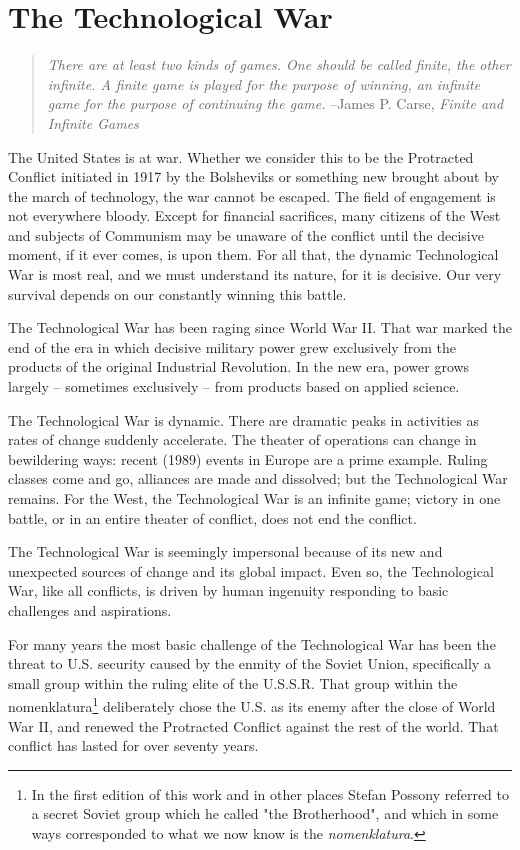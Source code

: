 \chapter{The Technological War}

\begin{quotation}
\textit{There are at least two kinds of games. One should be called finite, the other infinite. A finite game is played for the purpose of winning, an infinite game for the purpose of continuing the game.}
\newline
--James P. Carse, \textit{Finite and Infinite Games}
\end{quotation}

The United States is at war. Whether we consider this to be the Protracted Conflict initiated in 1917 by the Bolsheviks or something new brought about by the march of technology, the war cannot be escaped. The field of engagement is not everywhere bloody. Except for financial sacrifices, many citizens of the West and subjects of Communism may be unaware of the conflict until the decisive moment, if it ever comes, is upon them. For all that, the dynamic Technological War is most real, and we must understand its nature, for it is decisive. Our very survival depends on our constantly winning this battle.

The Technological War has been raging since World War II. That war marked the end of the era in which decisive military power grew exclusively from the products of the original Industrial Revolution. In the new era, power grows largely -- sometimes exclusively -- from products based on applied science.

The Technological War is dynamic. There are dramatic peaks in activities as rates of change suddenly accelerate. The theater of operations can change in bewildering ways: recent (1989) events in Europe are a prime example. Ruling classes come and go, alliances are made and dissolved; but the Technological War remains. For the West, the Technological War is an infinite game; victory in one battle, or in an entire theater of conflict, does not end the conflict.

The Technological War is seemingly impersonal because of its new and unexpected sources of change and its global impact. Even so, the Technological War, like all conflicts, is driven by human ingenuity responding to basic challenges and aspirations.

For many years the most basic challenge of the Technological War has been the threat to U.S. security caused by the enmity of the Soviet Union, specifically a small group within the ruling elite of the U.S.S.R. That group within the nomenklatura\footnote{In the first edition of this work and in other places Stefan Possony referred to a secret Soviet group which he called "the Brotherhood", and which in some ways corresponded to what we now know is the \textit{nomenklatura}.} deliberately chose the U.S. as its enemy after the close of World War II, and renewed the Protracted Conflict against the rest of the world. That conflict has lasted for over seventy years.


